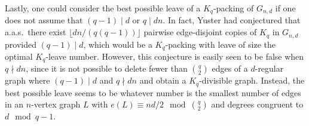 \documentclass[11pt]{article}
\def\COMMENT#1{}
\numberwithin{equation}{section}
\newcounter{i}
\theoremstyle{plain}
\theoremstyle{plain} %
\theoremstyle{definition}
\newcommand{\aas}{a.a.s.\ }
\begin{document}
Lastly, one could consider the best possible leave of a $K_q$-packing of $G_{n,d}$ if one does not assume that $(q - 1) \mid d$ or $q \mid dn$.  In fact, Yuster had conjectured that \aas there exist $\lfloor dn / (q(q - 1))\rfloor$ pairwise edge-disjoint copies of $K_q$ in $G_{n,d}$ provided $(q - 1) \mid d$, which would be a $K_q$-packing with leave of size the optimal $K_q$-leave number.  However, this conjecture is easily seen to be false when $q \nmid dn$, since it is not possible to delete fewer than $\binom{q}{2}$ edges of a $d$-regular graph where $(q - 1) \mid d$ and $q \nmid dn$ and obtain a $K_q$-divisible graph\COMMENT{We need to delete edges at some vertex $v$, and the number of edges incident to $v$ that we delete must be divisible by $(q - 1)$.  Hence, we must delete at least $q - 1$ edges at $v$, and then the same argument applied to other ends of the edges we delete implies that we need to delete at least $(q-1)(q - 2)/2$ additional edges.  Therefore, we need to delete at least $q - 1 + (q - 1)(q - 2)/2 = \binom{q}{2}$ edges.}.
Instead, the best possible leave seems to be whatever number is the smallest number of edges in an $n$-vertex graph $L$ with $e(L) \equiv nd/2 \mod \binom{q}{2}$ and degrees congruent to $d \mod q - 1$.

%
%
\end{document}
